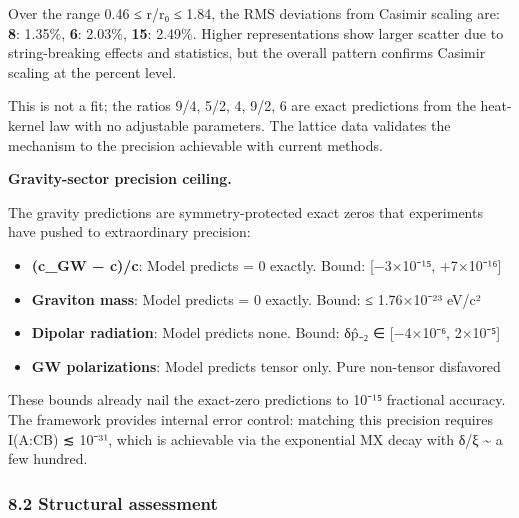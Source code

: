 \documentclass[11pt,a4paper]{article}
\theoremstyle{remark}
\providecommand{\tightlist}{%
  \setlength{\itemsep}{0pt}\setlength{\parskip}{0pt}}
\begin{document}
Over the range 0.46 ≤ r/r₀ ≤ 1.84, the RMS deviations from Casimir scaling are: \textbf{8}: 1.35\%, \textbf{6}: 2.03\%, \textbf{15}: 2.49\%. Higher representations show larger scatter due to string-breaking effects and statistics, but the overall pattern confirms Casimir scaling at the percent level.

This is not a fit; the ratios 9/4, 5/2, 4, 9/2, 6 are exact predictions from
the heat-kernel law with no adjustable parameters. The lattice data validates
the mechanism to the precision achievable with current methods.

\textbf{Gravity-sector precision ceiling.}

The gravity predictions are symmetry-protected exact zeros that experiments
have pushed to extraordinary precision:

\begin{itemize}
\tightlist
\item
  \textbf{(c\_GW − c)/c}: Model predicts = 0 exactly. Bound: {[}−3×10⁻¹⁵, +7×10⁻¹⁶{]}
\item
  \textbf{Graviton mass}: Model predicts = 0 exactly. Bound: ≤ 1.76×10⁻²³ eV/c²
\item
  \textbf{Dipolar radiation}: Model predicts none. Bound: δp̂₋₂ ∈ {[}−4×10⁻⁶, 2×10⁻⁵{]}
\item
  \textbf{GW polarizations}: Model predicts tensor only. Pure non-tensor disfavored
\end{itemize}

These bounds already nail the exact-zero predictions to 10⁻¹⁵ fractional
accuracy. The framework provides internal error control: matching this
precision requires I(A:C\textbar B) ≲ 10⁻³¹, which is achievable via the
exponential MX decay with δ/ξ \textasciitilde{} a few hundred.

\subsubsection{8.2 Structural assessment}\label{structural-assessment}
\end{document}
